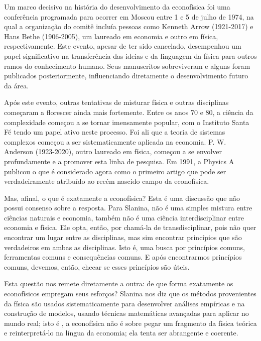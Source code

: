 Um marco decisivo na história do desenvolvimento da econofísica  foi uma conferência programada para ocorrer em Moscou entre 1 e 5 de julho de 1974, na qual a organização do comitê incluía pessoas como Kenneth Arrow (1921-2017) e Hans Bethe (1906-2005), um laureado em economia e outro em física, respectivamente. Este evento, apesar de ter sido cancelado, desempenhou um papel significativo na transferência das ideias e da linguagem da física para outros ramos do conhecimento humano. Seus  manuscritos sobreviveram e alguns foram publicados posteriormente, influenciando diretamente o desenvolvimento futuro da área\cite{slanina2013essentials}.

Após este evento, outras tentativas de misturar física e outras disciplinas começaram a florescer ainda mais fortemente. Entre os anos 70 e 80, a ciência da complexidade começou a se tornar imensamente popular, com o Instituto Santa Fé tendo um papel ativo neste processo. Foi ali  que a teoria de sistemas complexos começou a ser sistematicamente aplicada na economia. P. W. Anderson (1923-2020), outro laureado em física, começou a se envolver profundamente e a promover esta linha de pesquisa. Em 1991, a Physics A publicou o que é considerado agora como o primeiro artigo que pode ser verdadeiramente atribuído ao recém nascido campo da econofísica.

Mas, afinal, o que é exatamente a econofísica? Esta é uma discussão que não possui consenso sobre a resposta. Para Slanina, não é uma simples mistura entre ciências naturais e economia, também não é uma ciência interdisciplinar entre economia e física\cite{slanina2013essentials}. Ele opta, então, por chamá-la de transdisciplinar, pois  não quer encontrar um lugar entre as disciplinas, mas sim encontrar princípios que são verdadeiros em ambas as disciplinas. Isto é, uma busca por princípios comuns, ferramentas comuns e consequências comuns. E após encontrarmos princípios comuns, devemos, então, checar se esses princípios são úteis.

Esta questão nos remete diretamente a outra: de que forma exatamente os econofísicos empregam seus esforços? Slanina nos diz que os métodos provenientes da física são usados sistematicamente para desenvolver análises empíricas e na construção de modelos, usando técnicas matemáticas avançadas para aplicar no mundo real; isto é , a econofísica não é sobre pegar um fragmento da física teórica e reinterpretá-lo na língua da economia; ela tenta ser abrangente e coerente.

